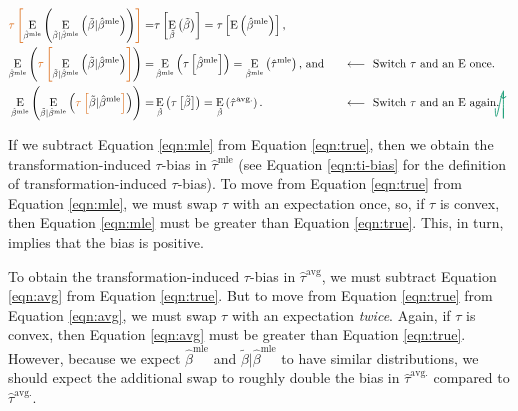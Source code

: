 \documentclass[10pt]{article}
\DeclareMathOperator*{\E}{\text{E}}
\newcommand{\tikzmark}[1]{\tikz[overlay,remember picture] \node (#1) {};}
\newcommand{\DrawBox}[2]{%
  \begin{tikzpicture}[overlay,remember picture]
    \draw[->,shorten >= 6pt, shorten <= 2pt, out=-90, in=90, distance=1.2cm, color2, thick] (MarkA.east) to (MarkB.east);
    \draw[->,shorten >= 6pt, shorten <= 2pt, out=-90, in=90, distance=1cm, color2, thick] (MarkC.west) to (MarkD.east);
  \end{tikzpicture}
}
\newcommand{\justif}[2]{&{#1}&\text{#2}}
\begin{document}
\begin{alignat}{2}
 \color{color1} \tikzmark{MarkA}\tau \left[ \normalcolor \E_{\hat{\beta}^\text{mle}}\left( \E_{\tilde{\beta} | \hat{\beta}^\text{mle}} \left( \tilde{\beta} | \hat{\beta}^\text{mle} \right) \right) \color{color1} \right] \normalcolor =&  \tau \left[ \E_{\tilde{\beta}} \left( \tilde{\beta} \right) \right] = \tau \left[\E \left( \hat{\beta}^\text{mle} \right) \right]\text{,} \label{eqn:true}\\
 \E_{\hat{\beta}^\text{mle}}\left( \color{color1} \tikzmark{MarkB}\tau\tikzmark{MarkC} \left[ \normalcolor \E_{\tilde{\beta} | \hat{\beta}^\text{mle}} \left( \tilde{\beta} | \hat{\beta}^\text{mle} \right) \color{color1} \right] \normalcolor \right)  =&  \E_{\hat{\beta}^\text{mle}} \left( \tau \left[\hat{\beta}^\text{mle} \right] \right) =  \E_{\hat{\beta}^\text{mle}} \left(\hat{\tau}^\text{mle} \right) \text{, and} \justif{\quad}{$\longleftarrow~$ Switch $\tau$ and an $\E$ once.} \label{eqn:mle}\\
\E_{\hat{\beta}^\text{mle}}\left( \E_{\tilde{\beta} | \hat{\beta}^\text{mle}} \left( \color{color1} \tikzmark{MarkD}\tau \left[ \normalcolor \tilde{\beta} | \hat{\beta}^\text{mle} \color{color1} \right] \normalcolor \right) \right)  =& 
\E_{\tilde{\beta}} \left( \tau \left[\tilde{\beta} \right] \right)  = 
\E_{\tilde{\beta}} \left(\hat{\tau}^\text{avg.} \right) \text{.}\justif{\quad}{$\longleftarrow~$ Switch $\tau$ and an $\E$ again.}\label{eqn:avg}\DrawBox{red}{blue}
\end{alignat}

If we subtract Equation \ref{eqn:mle} from Equation \ref{eqn:true}, then we obtain the transformation-induced $\tau$-bias in $\hat{\tau}^\text{mle}$ (see Equation \ref{eqn:ti-bias} for the definition of transformation-induced $\tau$-bias). 
To move from Equation \ref{eqn:true} from Equation \ref{eqn:mle}, we must swap $\tau$ with an expectation once, so, if $\tau$ is convex, then Equation \ref{eqn:mle} must be greater than Equation \ref{eqn:true}.
This, in turn, implies that the bias is positive.

To obtain the transformation-induced $\tau$-bias in $\hat{\tau}^\text{avg}$, we must subtract Equation \ref{eqn:avg} from Equation \ref{eqn:true}. 
But to move from Equation \ref{eqn:true} from Equation \ref{eqn:avg}, we must swap $\tau$ with an expectation \emph{twice}. 
Again, if $\tau$ is convex, then Equation \ref{eqn:avg} must be greater than Equation \ref{eqn:true}.
However, because we expect $\hat{\beta}^\text{mle}$ and $\tilde{\beta} | \hat{\beta}^\text{mle}$ to have similar distributions, we should expect the additional swap to roughly double the bias in $\hat{\tau}^\text{avg.}$ compared to $\hat{\tau}^\text{avg.}$.
\end{document}
